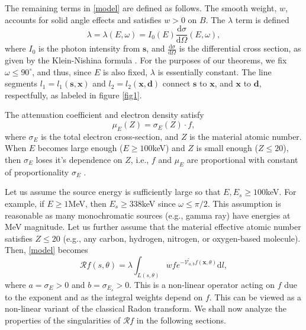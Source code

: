 \documentclass[a4paper,12pt]{amsart}
\numberwithin{equation}{section}
\theoremstyle{plain}
\numberwithin{theorem}{section}
\theoremstyle{definition}
\theoremstyle{remark}
\theoremstyle{remark}
\theoremstyle{remark}
\newcommand{\vx}{{\mathbf{x}}}
\newcommand{\vs}{\mathbf{s}}
\newcommand{\vd}{\mathbf{d}}
\begin{document}
The remaining terms in \eqref{model} are defined as follows. The smooth weight, $w$, accounts for solid angle effects \cite{me2} and satisfies $w > 0$ on $B$.
The $\lambda$ term is defined
\begin{equation}
\lambda = \lambda(E,\omega) = I_0(E)\frac{\mathrm{d}\sigma}{\mathrm{d}\Omega}(E,\omega),
\end{equation}
where $I_0$ is the photon intensity from $\vs$, and $\frac{\mathrm{d}\sigma}{\mathrm{d}\Omega}$ is the differential cross section, as given by the Klein-Nishina formula \cite{klein1929streuung}. For the purposes of our theorems, we fix $\omega \leq 90^{\circ}$, and thus, since $E$ is also fixed, $\lambda$ is essentially constant.
The line segments $l_1 = l_1(\vs,\vx)$ and $l_2 = l_2(\vx,\vd)$ connect $\vs$ to $\vx$, and $\vx$ to $\vd$, respectfully, as labeled in figure \ref{fig1}. %

The attenuation coefficient and electron density satisfy \cite{WebberQuinto2020II}
\begin{equation}
\mu_E(Z) = \sigma_E(Z)\cdot f,
\end{equation}
where $\sigma_E$ is the total electron cross-section, and $Z$ is the material atomic number. When $E$ becomes large enough ($E\geq 100$keV) and $Z$ is small enough ($Z\leq 20$), then $\sigma_E$ loses it's dependence on $Z$, i.e., $f$ and $\mu_E$ are proportional with constant of proportionality $\sigma_E$ \cite{WebberQuinto2020II}.

Let us assume the source energy is sufficiently large so that $E, E_s \geq 100$keV. For example, if $E\geq 1$MeV, then $E_s\geq 338$keV since $\omega \leq \pi/2$. This assumption is reasonable as many monochromatic sources (e.g., gamma ray) have energies at MeV magnitude. Let us further assume that the material effective atomic number satisfies $Z\leq 20$ (e.g., any carbon, hydrogen, nitrogen, or  oxygen-based molecule). Then, \eqref{model} becomes
\begin{equation}
\label{model_1}
\mathcal{R}f(s,\theta) = \lambda\int_{L(s,\theta)}w fe^{-\widetilde{ \mathcal{V}_{a,b} }f(\vx, \theta)}\mathrm{d}l,
\end{equation}
where $a = \sigma_E >0 $ and $b = \sigma_{E_s}>0$. This is a non-linear operator acting on $f$ due to the exponent and as the integral weights depend on $f$. This can be viewed as a non-linear variant of the classical Radon transform. We shall now analyze the properties of the singularities of $\mathcal{R}f$ in the following sections.
\end{document}
